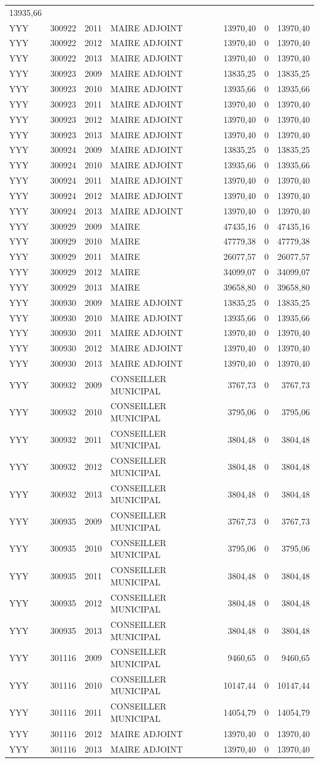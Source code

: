 \begin{longtable}[]{@{}llrlrrr@{}}
13935,66\tabularnewline
YYY & 300922 & 2011 & MAIRE ADJOINT & 13970,40 & 0 &
13970,40\tabularnewline
YYY & 300922 & 2012 & MAIRE ADJOINT & 13970,40 & 0 &
13970,40\tabularnewline
YYY & 300922 & 2013 & MAIRE ADJOINT & 13970,40 & 0 &
13970,40\tabularnewline
YYY & 300923 & 2009 & MAIRE ADJOINT & 13835,25 & 0 &
13835,25\tabularnewline
YYY & 300923 & 2010 & MAIRE ADJOINT & 13935,66 & 0 &
13935,66\tabularnewline
YYY & 300923 & 2011 & MAIRE ADJOINT & 13970,40 & 0 &
13970,40\tabularnewline
YYY & 300923 & 2012 & MAIRE ADJOINT & 13970,40 & 0 &
13970,40\tabularnewline
YYY & 300923 & 2013 & MAIRE ADJOINT & 13970,40 & 0 &
13970,40\tabularnewline
YYY & 300924 & 2009 & MAIRE ADJOINT & 13835,25 & 0 &
13835,25\tabularnewline
YYY & 300924 & 2010 & MAIRE ADJOINT & 13935,66 & 0 &
13935,66\tabularnewline
YYY & 300924 & 2011 & MAIRE ADJOINT & 13970,40 & 0 &
13970,40\tabularnewline
YYY & 300924 & 2012 & MAIRE ADJOINT & 13970,40 & 0 &
13970,40\tabularnewline
YYY & 300924 & 2013 & MAIRE ADJOINT & 13970,40 & 0 &
13970,40\tabularnewline
YYY & 300929 & 2009 & MAIRE & 47435,16 & 0 & 47435,16\tabularnewline
YYY & 300929 & 2010 & MAIRE & 47779,38 & 0 & 47779,38\tabularnewline
YYY & 300929 & 2011 & MAIRE & 26077,57 & 0 & 26077,57\tabularnewline
YYY & 300929 & 2012 & MAIRE & 34099,07 & 0 & 34099,07\tabularnewline
YYY & 300929 & 2013 & MAIRE & 39658,80 & 0 & 39658,80\tabularnewline
YYY & 300930 & 2009 & MAIRE ADJOINT & 13835,25 & 0 &
13835,25\tabularnewline
YYY & 300930 & 2010 & MAIRE ADJOINT & 13935,66 & 0 &
13935,66\tabularnewline
YYY & 300930 & 2011 & MAIRE ADJOINT & 13970,40 & 0 &
13970,40\tabularnewline
YYY & 300930 & 2012 & MAIRE ADJOINT & 13970,40 & 0 &
13970,40\tabularnewline
YYY & 300930 & 2013 & MAIRE ADJOINT & 13970,40 & 0 &
13970,40\tabularnewline
YYY & 300932 & 2009 & CONSEILLER MUNICIPAL & 3767,73 & 0 &
3767,73\tabularnewline
YYY & 300932 & 2010 & CONSEILLER MUNICIPAL & 3795,06 & 0 &
3795,06\tabularnewline
YYY & 300932 & 2011 & CONSEILLER MUNICIPAL & 3804,48 & 0 &
3804,48\tabularnewline
YYY & 300932 & 2012 & CONSEILLER MUNICIPAL & 3804,48 & 0 &
3804,48\tabularnewline
YYY & 300932 & 2013 & CONSEILLER MUNICIPAL & 3804,48 & 0 &
3804,48\tabularnewline
YYY & 300935 & 2009 & CONSEILLER MUNICIPAL & 3767,73 & 0 &
3767,73\tabularnewline
YYY & 300935 & 2010 & CONSEILLER MUNICIPAL & 3795,06 & 0 &
3795,06\tabularnewline
YYY & 300935 & 2011 & CONSEILLER MUNICIPAL & 3804,48 & 0 &
3804,48\tabularnewline
YYY & 300935 & 2012 & CONSEILLER MUNICIPAL & 3804,48 & 0 &
3804,48\tabularnewline
YYY & 300935 & 2013 & CONSEILLER MUNICIPAL & 3804,48 & 0 &
3804,48\tabularnewline
YYY & 301116 & 2009 & CONSEILLER MUNICIPAL & 9460,65 & 0 &
9460,65\tabularnewline
YYY & 301116 & 2010 & CONSEILLER MUNICIPAL & 10147,44 & 0 &
10147,44\tabularnewline
YYY & 301116 & 2011 & CONSEILLER MUNICIPAL & 14054,79 & 0 &
14054,79\tabularnewline
YYY & 301116 & 2012 & MAIRE ADJOINT & 13970,40 & 0 &
13970,40\tabularnewline
YYY & 301116 & 2013 & MAIRE ADJOINT & 13970,40 & 0 &
13970,40\tabularnewline
\bottomrule
\end{longtable}

